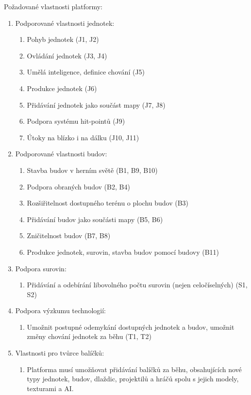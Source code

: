 Požadované vlastnosti platformy:
\begin{enumerate}
	\item Podporované vlastnosti jednotek:
		\begin{enumerate}
			\item Pohyb jednotek (J1, J2)
			\item Ovládání jednotek (J3, J4)
			\item Umělá inteligence, definice chování (J5)
			\item Produkce jednotek (J6)
			\item Přidávání jednotek jako součást mapy (J7, J8)
			\item Podpora systému hit-pointů (J9)
			\item Útoky na blízko i na dálku (J10, J11)
		\end{enumerate}
	\item Podporované vlastnosti budov:
		\begin{enumerate}
			\item Stavba budov v herním světě (B1, B9, B10)
			\item Podpora obraných budov (B2, B4)
			\item Rozšiřitelnost dostupného terénu o plochu budov (B3)
			\item Přidávání budov jako součásti mapy (B5, B6)
			\item Zničitelnost budov (B7, B8)
			\item Produkce jednotek, surovin, stavba budov pomocí budovy (B11)
		\end{enumerate}
	\item Podpora surovin:
		\begin{enumerate}
			\item Přidávání a odebírání libovolného počtu surovin (nejen celočíselných) (S1, S2)
		\end{enumerate}
	\item Podpora výzkumu technologií:
		\begin{enumerate}
			\item Umožnit postupné odemykání dostupných jednotek a budov, umožnit změny chování jednotek za běhu (T1, T2)
		\end{enumerate}
	\item Vlastnosti pro tvůrce balíčků:
		\begin{enumerate}
			\item Platforma musí umožňovat přidávání balíčků za běhu, obsahujících nové typy jednotek, budov,  dlaždic, projektilů a hráčů spolu s jejich modely, texturami a AI.

\end{enumerate}
\end{enumerate}
